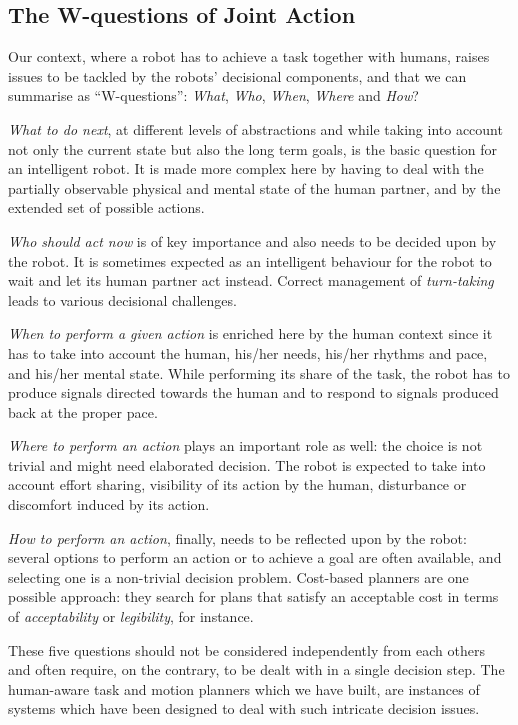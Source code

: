 \documentclass[preprint,3p,times]{elsarticle}
\begin{document}
\subsection{The W-questions of Joint Action}

Our context, where a robot has to achieve a task together with
humans, raises issues to be tackled by the robots' decisional components, and
that we can summarise as ``W-questions'': \emph{What}, \emph{Who}, \emph{When},
\emph{Where} and \emph{How}?

\emph{What to do next}, at different levels of abstractions and while taking
into account not only the current state but also the long term goals, is the
basic question for an intelligent robot. It is made more complex here by having
to deal with the partially observable physical and mental state of the human
partner, and by the extended set of possible actions.

\emph{Who should act now} is of key importance and also needs to be
decided upon by the robot. It is sometimes expected as an intelligent behaviour
for the robot to wait and let its human partner act instead. Correct management
of \emph{turn-taking} leads to various decisional challenges.

\emph{When to perform a given action} is enriched here by the human context
since it has to take into account the human, his/her needs, his/her rhythms and
pace, and his/her mental state. While performing its share of the task, the
robot has to produce signals directed towards the human and to respond to
signals produced back at the proper pace.

\emph{Where to perform an action} plays an important role as well: the choice is
not trivial and might need elaborated decision. The robot is expected to take
into account effort sharing, visibility of its action by the human, disturbance
or discomfort induced by its action.

\emph{How to perform an action}, finally, needs to be reflected upon by the
robot: several options to perform an action or to achieve a goal are often
available, and selecting one is a non-trivial decision problem. Cost-based
planners are one possible approach: they search for plans that satisfy an
acceptable cost in terms of \emph{acceptability} or \emph{legibility}, for
instance.

These five questions should not be considered independently from each others and
often require, on the contrary, to be dealt with in a single decision step. The
human-aware task and motion planners which we have built, are instances of
systems which have been designed to deal with such intricate decision issues.
\end{document}
